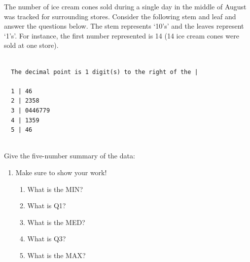 \documentclass[11pt, chapterprefix=true]{scrbook}\usepackage[]{graphicx}\usepackage[]{color}
\begin{document}
\begin{exercises}
\begin{exercise}
\begin{center}
\end{center}

The number of ice cream cones sold during a single day in the middle of August was tracked for surrounding stores.  Consider the following stem and leaf and answer the  questions below. The stem represents `10's' and the leaves represent `1's'.  For instance, the first number represented is 14 (14 ice cream cones were sold at one store). 

\vspace{-4mm} 

{\small{
\begin{verbatim}

  The decimal point is 1 digit(s) to the right of the |

  1 | 46
  2 | 2358
  3 | 0446779
  4 | 1359
  5 | 46


\end{verbatim}
}}

\vspace{-4mm}

\begin{minipage}[ht]{7cm}

{\small{Give the five-number summary of the data:}}

\vspace{-2mm}

{\small{
\begin{enumerate}
  \item Make sure to show your work!
  \begin{enumerate}
    \item What is the MIN?
    \item	What is Q1?
    \item	What is the MED?
    \item What is Q3?
    \item What is the MAX?
  \end{enumerate} 
  

\end{enumerate}}}
\end{minipage}
\end{exercise}
\end{exercises}
\end{document}
